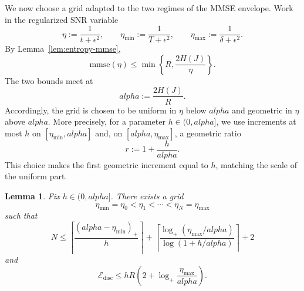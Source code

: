 \documentclass[11pt]{article}
\def\alpha{alpha}%
\newtheorem{lemma}{Lemma}
\newcommand{\E}{\mathbb{E}}
\newcommand{\mmse}{\mathrm{mmse}}
\newcommand{\eps}{\epsilon}
\newcommand{\norm}[1]{\left\lVert #1 \right\rVert}
\begin{document}


We now choose a grid adapted to the two regimes of the MMSE envelope. Work in the regularized SNR variable
\[
    \eta:=\frac{1}{t+\eps^2},
    \qquad
    \eta_{\min}:=\frac{1}{T+\eps^2},
    \qquad
    \eta_{\max}:=\frac{1}{\delta+\eps^2}.
\]
By Lemma~\ref{lem:entropy-mmse},
\[
    \mmse(\eta)\le \min\left\{R,\frac{2H(J)}{\eta}\right\}.
\]
The two bounds meet at
\[
    \alpha:=\frac{2H(J)}{R}.
\]
Accordingly, the grid is chosen to be uniform in $\eta$ below $\alpha$ and geometric in $\eta$ above $\alpha$. More precisely, for a parameter $h\in(0,\alpha]$, we use increments at most $h$ on $[\eta_{\min},\alpha]$ and, on $[\alpha,\eta_{\max}]$, a geometric ratio
\[
    r:=1+\frac{h}{\alpha}.
\]
This choice makes the first geometric increment equal to $h$, matching the scale of the uniform part.

\begin{lemma}
\label{lem:hybrid-grid-bound}
Fix $h\in(0,\alpha]$. There exists a grid
\[
    \eta_{\min}=\eta_0<\eta_1<\cdots<\eta_N=\eta_{\max}
\]
such that
\[
    N
    \le
    \left\lceil \frac{(\alpha-\eta_{\min})_+}{h}\right\rceil
    +
    \left\lceil
    \frac{\log_+(\eta_{\max}/\alpha)}
    {\log(1+h/\alpha)}
    \right\rceil
    +2
\]
and
\[
    \mathcal E_{\mathrm{disc}}
    \le
    hR
    \left(
    2+\log_+\frac{\eta_{\max}}{\alpha}
    \right).
\]
\end{lemma}
\end{document}

